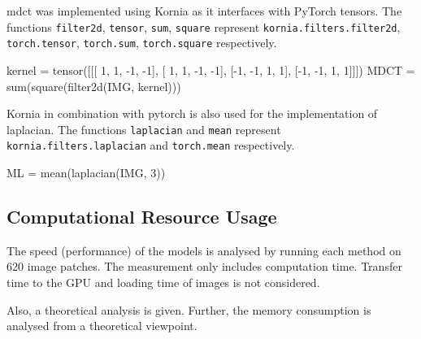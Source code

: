 \Ac{mdct} was implemented using Kornia as it interfaces with PyTorch tensors. The functions \texttt{filter2d}, \texttt{tensor}, \texttt{sum}, \texttt{square} represent \texttt{kornia.filters.filter2d}, \texttt{torch.tensor}, \texttt{torch.sum}, \texttt{torch.square} respectively.

\begin{python}
kernel = tensor([[[ 1,  1, -1, -1],
                  [ 1,  1, -1, -1],
                  [-1, -1,  1,  1],
                  [-1, -1,  1,  1]]])
MDCT = sum(square(filter2d(IMG, kernel)))
\end{python}

Kornia in combination with pytorch is also used for the implementation of \ac{laplacian}. The functions \texttt{laplacian} and \texttt{mean} represent \texttt{kornia.filters.laplacian} and \texttt{torch.mean} respectively.

\begin{python}
ML = mean(laplacian(IMG, 3))
\end{python}

\subsection{Computational Resource Usage}
\label{sec:Methods:Evaluation:Computation}

The speed (performance) of the models is analysed by running each method on 620 image patches. The measurement only includes computation time. Transfer time to the GPU and loading time of images is not considered.

Also, a theoretical analysis is given. Further, the memory consumption is analysed from a theoretical viewpoint. 


